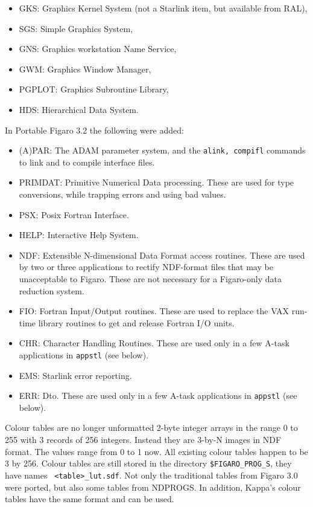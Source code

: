 \begin{itemize}
\item GKS: Graphics Kernel System
   (not a Starlink item, but available from RAL),
\item SGS: Simple Graphics System,
\item GNS: Graphics workstation Name Service,
\item GWM: Graphics Window Manager,
\item PGPLOT: Graphics Subroutine Library,
\item HDS: Hierarchical Data System.
\end{itemize}

In Portable Figaro 3.2 the following were added:

\begin{itemize}
\item (A)PAR: The ADAM parameter system, and the {\tt alink, compifl}
   commands to link and to compile interface files.
\item PRIMDAT: Primitive Numerical Data processing. These are used for type
   conversions, while trapping errors and using bad values.
\item PSX: Posix Fortran Interface.
\item HELP: Interactive Help System.
\item NDF: Extensible N-dimensional Data Format access routines. These
   are used by two or three applications to rectify NDF-format files
   that may be unacceptable to Figaro. These are not necessary for a
   Figaro-only data reduction system.
\item FIO: Fortran Input/Output routines. These are used to replace the
   VAX run-time library routines to get and release Fortran I/O units.
\item CHR: Character Handling Routines.  These are used only in a few
   A-task applications in {\tt appstl} (see below).
\item EMS: Starlink error reporting.
\item ERR: Dto.  These are used only in a few A-task applications in
   {\tt appstl} (see below).
\end{itemize}

Colour tables are no longer unformatted 2-byte integer arrays in the
range 0 to 255 with 3 records of 256 integers.  Instead they are 3-by-N
images in NDF format.  The values range from 0 to 1 now.  All existing
colour tables happen to be 3 by 256.  Colour tables are still stored in
the directory {\tt \$FIGARO\_PROG\_S}, they have names {\tt
<table>\_lut.sdf}.  Not only the traditional tables from Figaro 3.0 were
ported, but also some tables from NDPROGS.  In addition, Kappa's colour
tables have the same format and can be used.

